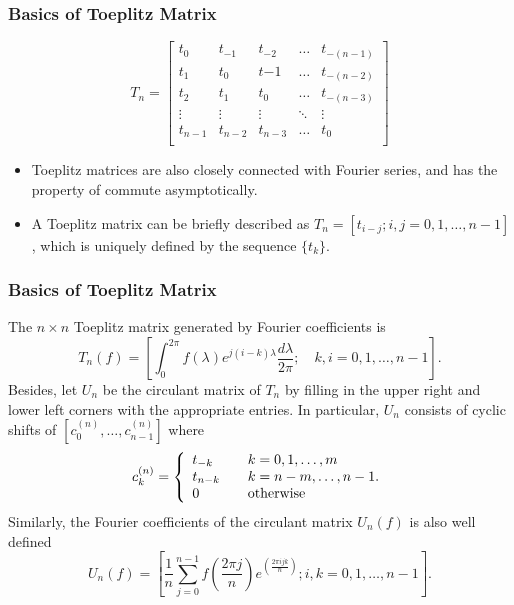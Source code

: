 \documentclass{beamer}
\begin{document}
\begin{frame}
\frametitle{Basics of Toeplitz Matrix}
\begin{equation}
   T_n = \begin{bmatrix}
     t_0 & t_{-1} & t_{-2} & \dots & t_{-(n-1)} \\
     t_1 & t_0 & t{-1} & \dots & t_{-(n-2)} \\
     t_2 & t_1 & t_0 & \dots & t_{-(n-3)} \\
     \vdots & \vdots& \vdots & \ddots & \vdots \\
     t_{n-1} & t_{n-2} & t_{n-3} & \dots & t_0 \\
     \end{bmatrix}
\end{equation}
\begin{itemize}
  \item Toeplitz matrices are also closely connected with Fourier series, and has the property of commute asymptotically.
  \item A Toeplitz matrix can be briefly described as $T_n=[t_{i-j};i,j=0,1,\dots,n-1]$, which is uniquely defined by the sequence $\{t_k\}$.
\end{itemize}
\end{frame}

\begin{frame}
\frametitle{Basics of Toeplitz Matrix}
The $n\times n$ Toeplitz matrix generated by Fourier coefficients is
\begin{equation}
  T_n(f)=\left[\int_0^{2\pi}f(\lambda)e^{j(i-k)\lambda}\frac{d\lambda}{2\pi};\quad k,i=0,1,\dots,n-1\right].
\end{equation}
Besides, let $U_n$ be the circulant matrix of $T_n$ by filling in the upper right and lower left corners with the appropriate entries. In particular, $U_n$ consists of cyclic shifts of $[c_0^{(n)},\dots,c_{n-1}^{(n)}]$ where
  \begin{equation}
    c_k^{(n)}=\left\{ 
      \begin{array}{l l}
        t_{-k} & \quad k=0,1,\dots,m \\
        t_{n-k} & \quad k=n-m,\dots,n-1. \\
        0 & \quad \text{otherwise} \\
      \end{array} \right.
  \end{equation}
Similarly, the Fourier coefficients of the circulant matrix $U_n(f)$ is also well defined
\begin{equation}
  \label{fourier_circulant}
  U_n(f) = \left[\frac{1}{n}\sum_{j=0}^{n-1}f\left(\frac{2\pi j}{n}\right)e^{\left(\frac{2\pi ijk}{n}\right)};i,k=0,1,\dots,n-1\right].
\end{equation}

\end{frame}
\end{document}

